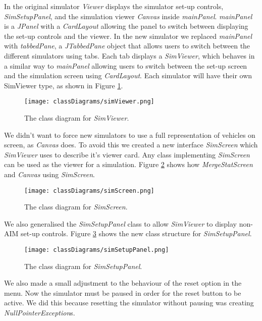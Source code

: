 \begin{appendices}
In the original simulator \emph{Viewer} displays the simulator set-up controls, \emph{SimSetupPanel}, and the simulation viewer \emph{Canvas} inside \emph{mainPanel}. \emph{mainPanel} is a \emph{JPanel} with a \emph{CardLayout} allowing the panel to switch between displaying the set-up controls and the viewer. In the new simulator we replaced \emph{mainPanel} with \emph{tabbedPane}, a \emph{JTabbedPane} object that allows users to switch between the different simulators using tabs. Each tab displays a \emph{SimViewer}, which behaves in a similar way to \emph{mainPanel} allowing users to switch between the set-up screen and the simulation screen using \emph{CardLayout}. Each simulator will have their own SimViewer type, as shown in Figure \ref{fig:simViewer}.

\begin{figure}[htb]
\centering
\texttt{[image: classDiagrams/simViewer.png]}
\caption{The class diagram for \emph{SimViewer}.}
\label{fig:simViewer}
\end{figure}

We didn't want to force new simulators to use a full representation of vehicles on screen, as \emph{Canvas} does. To avoid this we created a new interface \emph{SimScreen} which \emph{SimViewer} uses to describe it's viewer card. Any class implementing \emph{SimScreen} can be used as the viewer for a simulation. Figure \ref{fig:simScreen} shows how \emph{MergeStatScreen} and \emph{Canvas} using \emph{SimScreen}.

\begin{figure}[htb]
\centering
\texttt{[image: classDiagrams/simScreen.png]}
\caption{The class diagram for \emph{SimScreen}.}
\label{fig:simScreen}
\end{figure}

We also generalised the \emph{SimSetupPanel} class to allow \emph{SimViewer} to display non-AIM set-up controls. Figure \ref{fig:simSetupPanel} shows the new class structure for \emph{SimSetupPanel}.

\begin{figure}[htb]
\centering
\texttt{[image: classDiagrams/simSetupPanel.png]}
\caption{The class diagram for \emph{SimSetupPanel}.}
\label{fig:simSetupPanel}
\end{figure}

We also made a small adjustment to the behaviour of the reset option in the menu. Now the simulator must be paused in order for the reset button to be active. We did this because resetting the simulator without pausing was creating \emph{NullPointerException}s.


\end{appendices}
